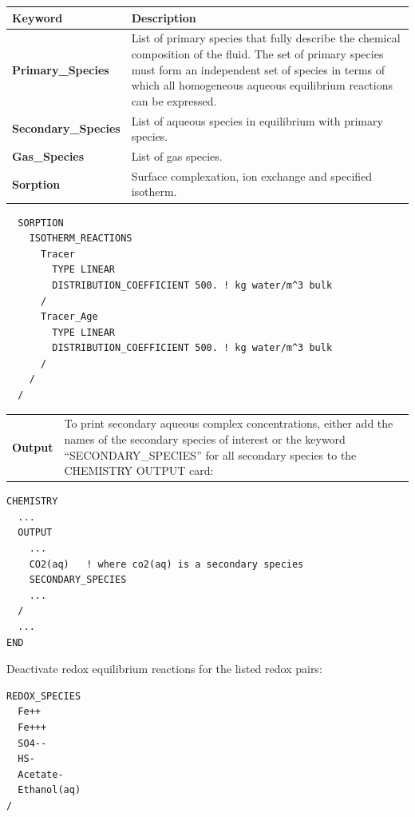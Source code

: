 \documentclass[12pt]{article}
\begin{document}
\begin{center}
\begin{tabularx}{\linewidth}{lX}
\toprule
\bf Keyword & \bf Description\\
\midrule
\bf Primary\_Species & List of primary species that fully describe the chemical composition of the fluid. The set of primary species must form an independent set of species in terms of which all homogeneous aqueous equilibrium reactions can be expressed.\\
\midrule
\bf Secondary\_Species & List of aqueous species in equilibrium with primary species.\\
\midrule
\bf Gas\_Species & List of gas species.\\
\midrule
\bf Sorption & Surface complexation, ion exchange and specified isotherm.\\
\end{tabularx}

\begin{mdframed}

\begin{verbatim}
  SORPTION
    ISOTHERM_REACTIONS
      Tracer
        TYPE LINEAR 
        DISTRIBUTION_COEFFICIENT 500. ! kg water/m^3 bulk
      /
      Tracer_Age
        TYPE LINEAR 
        DISTRIBUTION_COEFFICIENT 500. ! kg water/m^3 bulk
      /
    /
  /
\end{verbatim}
\end{mdframed}

\end{center}

\begin{center}
\begin{tabularx}{\linewidth}{lX}
\midrule
\bf Output &
To print secondary aqueous complex concentrations, either add the names of the secondary species of interest or the keyword ``SECONDARY\_SPECIES'' for all secondary species to the CHEMISTRY OUTPUT card:
\end{tabularx}
\end{center}

\begin{mdframed}

\begin{verbatim}
CHEMISTRY
  ...
  OUTPUT
    ...
    CO2(aq)   ! where co2(aq) is a secondary species
    SECONDARY_SPECIES
    ...
  /
  ...
END
\end{verbatim}

Deactivate redox equilibrium reactions for the listed redox pairs:
\begin{verbatim}
REDOX_SPECIES
  Fe++
  Fe+++
  SO4--
  HS-
  Acetate-
  Ethanol(aq)
/
\end{verbatim}
\end{mdframed}
\end{document}
